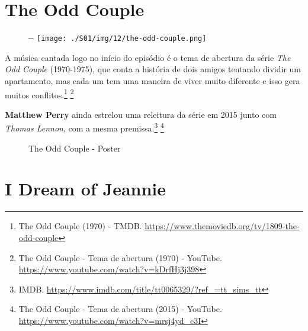 \hypertarget{the-odd-couple}{%
\section{The Odd Couple}\label{the-odd-couple}}

\begin{figure}[!ht]
  \begin{adjustwidth}{-\oddsidemargin-1in}{-\rightmargin}
    \centering
    \texttt{[image: ./S01/img/12/the-odd-couple.png]}
  \end{adjustwidth}
\end{figure}

A música cantada logo no início do episódio é o tema de abertura da
série \emph{The Odd Couple} (1970-1975), que conta a história de dois
amigos tentando dividir um apartamento, mas cada um tem uma maneira de
viver muito diferente e isso gera muitos conflitos.\footnote{\sloppy The Odd Couple (1970) - TMDB. \url{https://www.themoviedb.org/tv/1809-the-odd-couple}}
\footnote{\sloppy The Odd Couple - Tema de abertura (1970) - YouTube. \url{https://www.youtube.com/watch?v=kDrfHj3j398}}

\textbf{Matthew Perry} ainda estrelou uma releitura da série em 2015
junto com \emph{Thomas Lennon}, com a mesma premissa.\footnote{\sloppy IMDB. \url{https://www.imdb.com/title/tt0065329/?ref_=tt_sims_tt}}
\footnote{\sloppy The Odd Couple - Tema de abertura (2015) - YouTube. \url{https://www.youtube.com/watch?v=mrsj4yd_c3I}}

\begin{figure}
  \centering
    \caption{The Odd Couple - Poster\label{fig:the-odd-couple-poster}}
\end{figure}

\hypertarget{i-dream-of-jeannie}{%
\section{I Dream of Jeannie}\label{i-dream-of-jeannie}}

